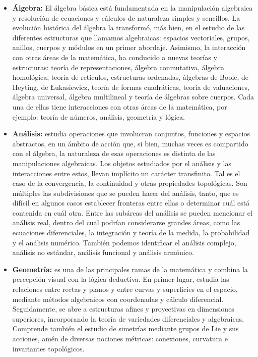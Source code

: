 \begin{itemize}
    
     \color{blue} \item \color{black} \textbf{Álgebra:} El álgebra básica está fundamentada en la manipulación algebraica y resolución de ecuaciones y cálculos de naturaleza simples y sencillos. La evolución histórica del álgebra la transformó, más bien, en el estudio de las diferentes estructuras que llamamos algebraicas: espacios vectoriales, grupos, anillos, cuerpos y módulos en un primer abordaje. Asimismo, la interacción con otras áreas de la matemática, ha conducido a nuevas teorías y estructuras: teoría de representaciones, álgebra conmutativa, álgebra homológica, teoría de retículos, estructuras ordenadas, álgebras de Boole, de Heyting, de \L ukasiewicz, teoría de formas cuadráticas, teoría de valuaciones, álgebra universal, álgebra multilineal y teoría de álgebras sobre cuerpos. Cada una de ellas tiene interacciones con otras áreas de la matemática, por ejemplo: teoría de números, análisis, geometría y lógica. 
     
    \color{blue} \item \color{black}  \textbf{Análisis:} estudia operaciones que involucran conjuntos, funciones y espacios abstractos, en un ámbito de acción que, si bien, muchas veces es compartido con el álgebra, la naturaleza de esas operaciones es distinta de las manipulaciones algebraicas. Los objetos estudiados por el análisis y las interacciones entre estos, llevan implícito un carácter transfinito. Tal es el caso de la convergencia, la continuidad y otras propiedades topológicas. Son múltiples las subdivisiones que se pueden hacer del análisis, tanto, que es difícil en algunos casos establecer fronteras entre ellas o determinar cuál está contenida en cuál otra. Entre las subáreas del análisis se pueden mencionar el análisis real, dentro del cual podrían considerarse grandes áreas, como las ecuaciones diferenciales, la integración y teoría de la medida, la probabilidad y el análisis numérico. También podemos identificar el análisis complejo, análisis no estándar, análisis funcional y análisis armónico.
    
    \color{blue} \item \color{black} \textbf{Geometría:} es una de las principales ramas de la matemática y combina la percepción visual con la lógica deductiva. En primer lugar, estudia las relaciones entre rectas y planos y entre curvas y superficies en el espacio, mediante métodos algebraicos con coordenadas y cálculo diferencial. Seguidamente, se abre a estructuras afines y proyectivas en dimensiones superiores, incorporando la teoría de variedades diferenciales y algebraicas. Comprende también el estudio de simetrías mediante grupos de Lie y sus acciones, amén de diversas nociones métricas: conexiones, curvatura e invariantes topológicos.
    

\end{itemize}

